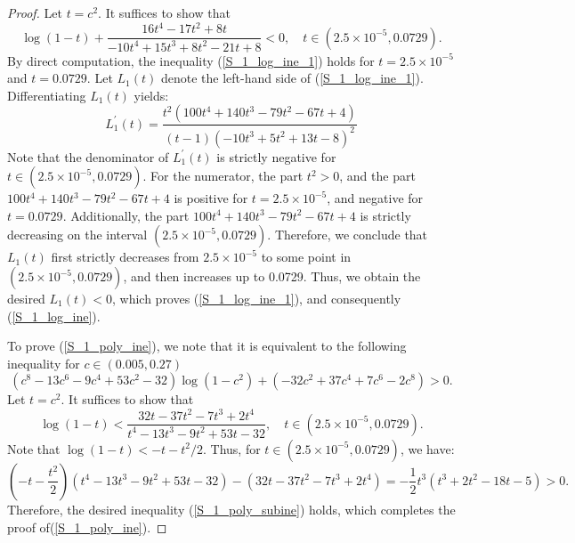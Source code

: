 ﻿\documentclass[10pt]{article}
\begin{document}
\begin{proof}
Let $t = c^2$. It suffices to show that
\begin{equation}
    \log(1-t)+\frac{16t^4 - 17t^2+8t}{-10t^4+15t^3+8t^2-21t+8}<0,\quad t\in(2.5\times10^{-5}, 0.0729).\label{S_1_log_ine_1}
\end{equation}
By direct computation, the  inequality (\ref{S_1_log_ine_1}) holds for $t = 2.5\times10^{-5}$ and $t=0.0729$. Let $L_1(t)$ denote the left-hand side of (\ref{S_1_log_ine_1}). Differentiating $L_{1}(t)$ yields:
$$L_1^{'}(t)=\frac{t^2(100t^4+140t^3-79t^2-67t+4)}{(t - 1)(- 10t^3 + 5t^2 + 13t - 8)^2}
$$
Note that the denominator of $L_1^{'}(t)$ is strictly negative for $t\in(2.5\times10^{-5}, 0.0729)$. For the numerator, the part $t^2>0$, and the part $100t^4+140t^3-79t^2-67t+4$ is positive for $t=2.5\times10^{-5}$, and negative for $t=0.0729$. Additionally, the part $100t^4+140t^3-79t^2-67t+4$ is strictly decreasing on the interval $(2.5\times10^{-5}, 0.0729)$. Therefore, we conclude that $L_1(t)$ first strictly decreases from $2.5\times10^{-5}$ to some point in $(2.5\times10^{-5}, 0.0729)$, and then increases up to 0.0729. Thus, we obtain the desired $L_1(t)<0$, which proves (\ref{S_1_log_ine_1}), and consequently (\ref{S_1_log_ine}).

To prove (\ref{S_1_poly_ine}), we note that it is equivalent to the following inequality for $c\in(0.005, 0.27)$
$$(c^8-13c^6-9c^4+53c^2-32)\log(1-c^2)+(-32c^2+37c^4+7c^6-2c^8)>0.
$$
Let $t = c^2$. It suffices to show that
\begin{equation}
\log(1-t)<\frac{32t-37t^2-7t^3+2t^4}{t^4 -13t^3-9t^2+53t-32},\quad t\in(2.5\times10^{-5}, 0.0729).\label{S_1_poly_subine}    
\end{equation}
Note that $\log(1-t)<-t-t^2/2$. Thus, for $t\in(2.5\times10^{-5}, 0.0729)$, we have:
$$(-t-\frac{t^2}{2})(t^4 -13t^3-9t^2+53t-32)-(32t-37t^2-7t^3+2t^4) = -\frac{1}{2}t^3(t^3+2t^2-18t-5)>0.
$$
Therefore, the desired inequality (\ref{S_1_poly_subine}) holds, which completes the proof of(\ref{S_1_poly_ine}).


\end{proof}
\end{document}
